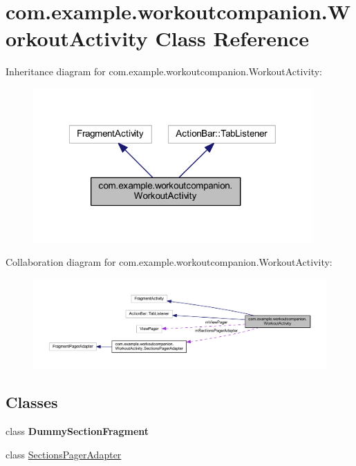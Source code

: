 \hypertarget{classcom_1_1example_1_1workoutcompanion_1_1_workout_activity}{\section{com.\-example.\-workoutcompanion.\-Workout\-Activity Class Reference}
\label{classcom_1_1example_1_1workoutcompanion_1_1_workout_activity}
}


Inheritance diagram for com.\-example.\-workoutcompanion.\-Workout\-Activity\-:
\nopagebreak
\begin{figure}[H]
\begin{center}
\leavevmode
\includegraphics[width=303pt]{classcom_1_1example_1_1workoutcompanion_1_1_workout_activity__inherit__graph}
\end{center}
\end{figure}


Collaboration diagram for com.\-example.\-workoutcompanion.\-Workout\-Activity\-:
\nopagebreak
\begin{figure}[H]
\begin{center}
\leavevmode
\includegraphics[width=350pt]{classcom_1_1example_1_1workoutcompanion_1_1_workout_activity__coll__graph}
\end{center}
\end{figure}
\subsection*{Classes}
\begin{DoxyCompactItemize}
\item 
class {\bfseries Dummy\-Section\-Fragment}
\item 
class \hyperlink{classcom_1_1example_1_1workoutcompanion_1_1_workout_activity_1_1_sections_pager_adapter}{Sections\-Pager\-Adapter}
\end{DoxyCompactItemize}
